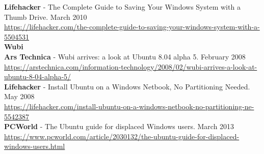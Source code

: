 \textbf{Lifehacker} - The Complete Guide to Saving Your Windows System with a Thumb Drive. \hfill March 2010\\
\url{https://lifehacker.com/the-complete-guide-to-saving-your-windows-system-with-a-5504531}\\



\textcolor{sectcol}{\textbf{Wubi}}\\

\textbf{Ars Technica} - Wubi arrives: a look at Ubuntu 8.04 alpha 5. \hfill February 2008\\
\url{https://arstechnica.com/information-technology/2008/02/wubi-arrives-a-look-at-ubuntu-8-04-alpha-5/}\\

\textbf{Lifehacker} - Install Ubuntu on a Windows Netbook, No Partitioning Needed. \hfill May 2008\\
\url{https://lifehacker.com/install-ubuntu-on-a-windows-netbook-no-partitioning-ne-5542387}\\

\textbf{PCWorld} - The Ubuntu guide for displaced Windows users. \hfill March 2013\\
\url{https://www.pcworld.com/article/2030132/the-ubuntu-guide-for-displaced-windows-users.html}\\